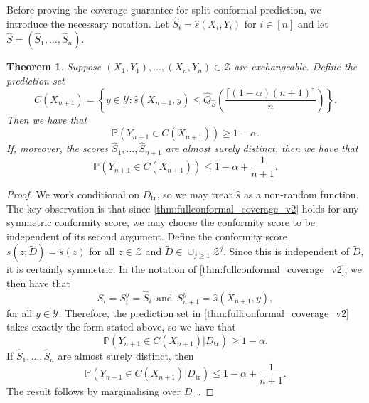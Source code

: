 \documentclass[11pt, titlepage]{article} %
\newcommand{\Prob}[1]{\mathbb{P}\left( #1 \right)}
\numberwithin{equation}{section}
\newtheorem{theorem}{Theorem}
\theoremstyle{definition}
\numberwithin{theorem}{section}
\numberwithin{lemma}{section}
\numberwithin{corollary}{section}
\numberwithin{proposition}{section}
\numberwithin{definition}{section}
\numberwithin{remark}{section}
\begin{document}
\noindent
Before proving the coverage guarantee for split conformal prediction, we introduce the necessary notation. Let \(\hat{S}_i = \hat{s}(X_i, Y_i)\) for \(i \in [n]\) and let \(\hat{S} = (\hat{S}_1, \ldots, \hat{S}_n)\).

\begin{theorem}
    Suppose \((X_1, Y_1), \ldots, (X_n, Y_n) \in \mathcal{Z}\) are exchangeable. Define the prediction set \begin{equation}
        C(X_{n+1}) = \left\{ y \in \mathcal{Y} : \hat{s}(X_{n+1}, y) \leq \hat{Q}_{\hat{S}} \left( \frac{\lceil (1-\alpha)(n+1) \rceil}{n} \right) \right\}.
    \label{eqn:splitconformal_prediction_set}
    \end{equation} Then we have that \[\Prob{Y_{n+1} \in C(X_{n+1})} \geq 1-\alpha.\] If, moreover, the scores \(\hat{S}_1, \ldots, \hat{S}_{n+1}\) are almost surely distinct, then we have that \[\Prob{Y_{n+1} \in C(X_{n+1})} \leq 1-\alpha + \frac{1}{n+1}.\]
\label{thm:splitconformal_coverage}
\end{theorem}
\begin{proof}
    We work conditional on \(D_\mathrm{tr}\), so we may treat \(\hat{s}\) as a non-random function. The key observation is that since \cref{thm:fullconformal_coverage_v2} holds for any symmetric conformity score, we may choose the conformity score to be independent of its second argument. Define the conformity score \(s(z; \tilde{D}) = \hat{s}(z)\) for all \(z \in \mathcal{Z}\) and \(\tilde{D} \in \cup_{j \geq 1} \mathcal{Z}^j\). Since this is independent of \(\tilde{D}\), it is certainly symmetric. In the notation of \cref{thm:fullconformal_coverage_v2}, we then have that \[S_i = S_i^y = \hat{S}_i \ \ \mathrm{and} \ \ S_{n+1}^y = \hat{s}(X_{n+1}, y),\] for all \(y \in \mathcal{Y}\). Therefore, the prediction set in \cref{thm:fullconformal_coverage_v2} takes exactly the form stated above, so we have that \[\Prob{Y_{n+1} \in C(X_{n+1}) | D_{\mathrm{tr}}  } \geq 1-\alpha.\] If \(\hat{S}_1, \ldots, \hat{S}_n\) are almost surely distinct, then \[\Prob{Y_{n+1} \in C(X_{n+1}) | D_{\mathrm{tr}}  } \leq 1-\alpha + \frac{1}{n+1}.\] The result follows by marginalising over \(D_\mathrm{tr}.\)
\end{proof}
\end{document}
